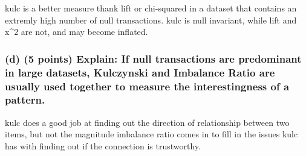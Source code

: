 \documentclass[
]{article}
\begin{document}
kulc is a better measure thank lift or chi-squared in a dataset that
contains an extremly high number of null transactions. kulc is null
invariant, while lift and x\^{}2 are not, and may become inflated.

\subsubsection{(d) (5 points) Explain: If null transactions are
predominant in large datasets, Kulczynski and Imbalance Ratio are
usually used together to measure the interestingness of a
pattern.}\label{d-5-points-explain-if-null-transactions-are-predominant-in-large-datasets-kulczynski-and-imbalance-ratio-are-usually-used-together-to-measure-the-interestingness-of-a-pattern.}

kulc does a good job at finding out the direction of relationship
between two items, but not the magnitude imbalance ratio comes in to
fill in the issues kulc has with finding out if the connection is
trustworthy.
\end{document}
